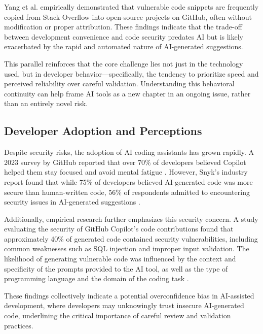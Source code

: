 Yang et al. \cite{yang2017code} empirically demonstrated that vulnerable code snippets are frequently copied from Stack Overflow into open-source projects on GitHub, often without modification or proper attribution. These findings indicate that the trade-off between development convenience and code security predates AI but is likely exacerbated by the rapid and automated nature of AI-generated suggestions.

This parallel reinforces that the core challenge lies not just in the technology used, but in developer behavior—specifically, the tendency to prioritize speed and perceived reliability over careful validation. Understanding this behavioral continuity can help frame AI tools as a new chapter in an ongoing issue, rather than an entirely novel risk.


\subsection{Developer Adoption and Perceptions}
Despite security risks, the adoption of AI coding assistants has grown rapidly. A 2023 survey by GitHub reported that over 70\% of developers believed Copilot helped them stay focused and avoid mental fatigue \cite{githubSurvey}. However, Snyk’s industry report found that while 75\% of developers believed AI-generated code was more secure than human-written code, 56\% of respondents admitted to encountering security issues in AI-generated suggestions \cite{snyk2023}.

Additionally, empirical research further emphasizes this security concern. A study evaluating the security of GitHub Copilot’s code contributions found that approximately 40\% of generated code contained security vulnerabilities, including common weaknesses such as SQL injection and improper input validation. The likelihood of generating vulnerable code was influenced by the context and specificity of the prompts provided to the AI tool, as well as the type of programming language and the domain of the coding task \cite{pearce2021asleep}.

These findings collectively indicate a potential overconfidence bias in AI-assisted development, where developers may unknowingly trust insecure AI-generated code, underlining the critical importance of careful review and validation practices.


